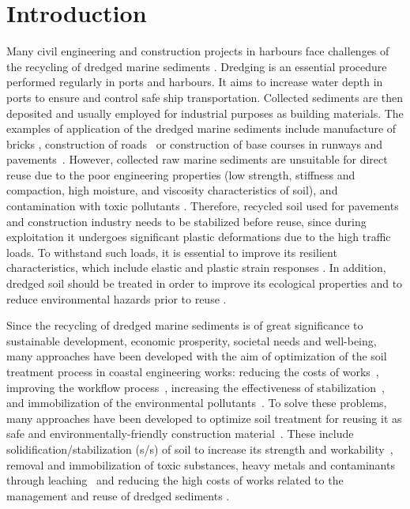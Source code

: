 \documentclass[sustainability,article,accept,pdftex,moreauthors]{Definitions/mdpi}
\begin{document}
\section{Introduction}


Many civil engineering and construction projects in harbours face challenges of {the }recycling of dredged marine sediments \cite{LIM2020110869,Lindh202208,Wangetal2022}. Dredging is an essential procedure performed regularly in ports and harbours. It aims to increase water depth in ports to ensure {and control }safe ship transportation. Collected sediments are then deposited and usually employed for industrial purposes as building materials. {The }examples of application of {the }dredged {marine }sediments include manufacture of bricks \cite{HUSSAIN2022100046,SLIMANOU2020101085}, construction of roads~\cite{Wangetal2017} {or} construction of base courses in runways and pavements~\cite{Yoobanpot}. However, collected {raw }marine sediments are unsuitable for direct reuse due to {the }poor engineering properties (low strength, stiffness and compaction, high moisture, and viscosity characteristics of soil), and contamination with toxic pollutants \cite{Calmano1986,Pedersen}. Therefore, recycled soil used for pavements and construction industry needs to be stabilized before reuse, {since during exploitation} it undergoes significant plastic deformations due to the high traffic loads. To withstand such loads{,} it is{ }essential to improve its resilient characteristics, which include elastic and plastic strain responses \cite{Puppala}. In addition, dredged soil should be treated {in order }to improve its ecological properties and to reduce environmental hazards prior to reuse \cite{CROCETTI202220}. 

Since the recycling of dredged marine sediments is of great significance to sustainable development, economic prosperity, societal needs and well-being, many approaches have been developed with the aim of optimization of the soil treatment process in coastal engineering works: reducing {the }costs of works~\cite{SVENSSON202230}, improving the workflow process~\cite{Grubbetal2008}, increasing the effectiveness of stabilization~\cite{YU2021125568,Dermatas}, and immobilization of {the }environmental \mbox{pollutants~\cite{Wangetal2021}.} To solve these problems, many approaches have been developed to optimize soil treatment for reusing it as safe and environmentally-friendly construction \mbox{material~\cite{Calmano1988}.} These include solidification/stabilization (s/s) of soil to increase its strength and workability~\cite{ZHANG2020138551}, removal and immobilization of toxic substances, heavy metals and contaminants through leaching~\cite{SLAMA2021127,Lemenkova202233,ZHANG2021128926,CHI2023131545} and reducing {the }high costs of works related to {the }management and reuse of dredged sediments \cite{Rocha,WANG201869}. 
\end{document}
